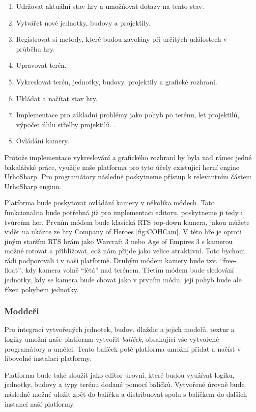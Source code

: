\begin{enumerate}
	\item Udržovat aktuální stav hry a umožňovat dotazy na tento stav.
	\item Vytvářet nové jednotky, budovy a projektily.
	\item Registrovat si metody, které budou zavolány při určitých událostech v průběhu hry.
	\item Upravovat terén.
	\item Vykreslovat terén, jednotky, budovy, projektily a grafické rozhraní.
	\item Ukládat a načítat stav hry.
	\item Implementace pro základní problémy jako pohyb po terénu, let projektilů, výpočet úhlu střelby projektilů. .
	\item Ovládání kamery.
\end{enumerate}

Protože implementace vykreslování a grafického rozhraní by byla nad rámec jedné bakalářské práce, využije naše platforma pro tyto účely existující herní engine UrhoSharp. Pro programátory následně  poskytneme přístup k relevantním částem UrhoSharp enginu.

Platforma bude poskytovat ovládání kamery v několika módech. Tato funkcionalita bude potřebná již pro implementaci editoru, poskytneme ji tedy i tvůrcům her. Prvním módem bude klasická RTS top-down kamera, jakou můžete vidět na ukázce ze hry Company of Heroes \ref{fig:COHCam}. V této hře je oproti jiným starším RTS hrám jako Warcraft 3 nebo Age of Empires 3 s kamerou možné rotovat a přibližovat, což nám přijde jako velice atraktivní. Toto bychom rádi podporovali i v naší platformě. Druhým módem kamery bude tzv. ``free-float'', kdy kamera volně ``létá'' nad terénem. Třetím módem bude sledování jednotky, kdy se kamera bude chovat jako v prvním módu, její pohyb bude ale řízen pohybem jednotky.

\subsubsection{Moddeři}

Pro integraci vytvořených jednotek, budov, dlaždic a jejich modelů, textur a logiky umožní naše platforma vytvořit \emph{balíček}, obsahující vše vytvořené programátory a umělci.  Tento balíček poté platforma umožní přidat a načíst v libovolné instalaci platformy.

Platforma bude také sloužit jako editor úrovní, které budou využívat logiku, jednotky, budovy a typy terénu dodané pomocí balíčků. Vytvořené úrovně bude následně možné uložit zpět do balíčku a distribuovat spolu s balíčkem do dalších instancí naší platformy.

